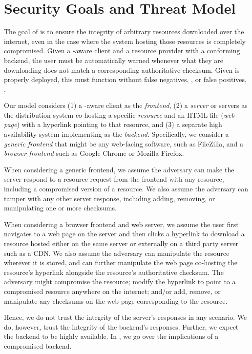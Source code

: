 \section{Security Goals and Threat Model} \label{sec:model}

The goal of \SYSTEM{} is to ensure the integrity of arbitrary resources
downloaded over the internet, even in the case where the system hosting those
resources is completely compromised. Given a \SYSTEM{}-aware client and a
resource provider with a conforming backend, the user must be automatically
warned whenever what they are downloading does not match a corresponding
authoritative checksum. Given \SYSTEM{} is properly deployed, this must function
without false negatives, , or false positives, .

Our model considers (1) a \SYSTEM{}-aware client as the \emph{frontend}, (2) a
\emph{server} or servers as the distribution system co-hosting a specific
\emph{resource} and an HTML file (\emph{web page}) with a hyperlink pointing to
that resource, and (3) a separate high availability system implementing
\SYSTEM{} as the \emph{backend}. Specifically, we consider a \emph{generic
frontend} that might be any web-facing software, such as FileZilla, and a
\emph{browser frontend} such as Google Chrome or Mozilla Firefox.

When considering a generic frontend, we assume the adversary can make the server
respond to a resource request from the frontend with any resource, including a
compromised version of a resource. We also assume the adversary can tamper with
any other server response, including adding, removing, or manipulating one or
more checksums.

When considering a browser frontend and web server, we assume the user first
navigates to a web page on the server and then clicks a hyperlink to download a
resource hosted either on the same server or externally on a third party server
such as a CDN. We also assume the adversary can manipulate the resource wherever
it is stored, and can further manipulate the web page co-hosting the resource's
hyperlink alongside the resource's authoritative checksum. The adversary might
compromise the resource; modify the hyperlink to point to a compromised resource
anywhere on the internet; and/or add, remove, or manipulate any checksums on the
web page corresponding to the resource.

Hence, we do not trust the integrity of the server's responses in any scenario.
We do, however, trust the integrity of the backend's responses. Further, we
expect the backend to be highly available. In , we go over
the implications of a compromised backend.
